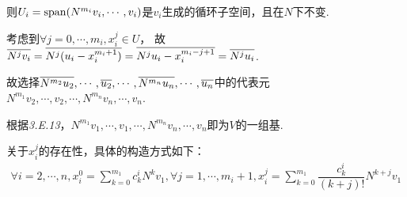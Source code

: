 则\(U_i=\mathrm{span}(N^{m_i}v_i,\cdots,v_i)\)是\(v_i\)生成的循环子空间，且在\(N\)下不变.

考虑到\(\forall j=0,\cdots,m_i,x_i^j \in U\)，
故\(\overline{N^jv_i}=\overline{N^j(u_i-x_i^{m_i+1})}=\overline{N^ju_i-x_i^{m_i-j+1}}=\overline{N^ju_i}\).

故选择\(\overline{N^{m_2}u_2},\cdots,\overline{u_2},\cdots,\overline{N^{m_n}u_n},\cdots,\overline{u_n}\)中的代表元
\(N^{m_1}v_2,\cdots,v_2,\cdots,N^{m_n}v_n,\cdots,v_n\).

根据\textit{3.E.13}，\(N^{m_1}v_1,\cdots,v_1,\cdots,N^{m_n}v_n,\cdots,v_n\)即为\(V\)的一组基.

关于\(x_i^j\)的存在性，具体的构造方式如下：
    \begin{align*}
        \forall i=2,\cdots,n,x_i^0=\sum_{k=0}^{m_1}c_k^iN^kv_1,
        \forall j=1,\cdots,m_i+1,x_i^j=\sum_{k=0}^{m_1}\dfrac{c_k^i}{(k+j)!}N^{k+j}v_1
    \end{align*}

